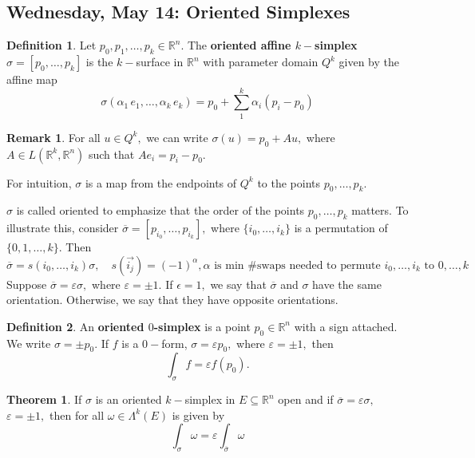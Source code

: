 \documentclass[10pt, oneside]{article}
\newcommand{\bbR}{\mathbb{R}}
\theoremstyle{definition}
\newtheorem{thm}{Theorem}
\newtheorem{defn}{Definition}
\newtheorem{rem}{Remark}
\begin{document}
\newpage
\subsection{Wednesday, May 14: Oriented Simplexes}
\begin{defn}
    Let $p_0, p_1, \dots, p_k \in \bbR^n.$ The \textbf{oriented affine $k-$simplex} $\sigma = [p_0, \dots, p_k]$ is the $k-$surface in $\bbR^n$ with parameter domain $Q^k$ given by the affine map 
    \[\sigma(\alpha_1\,e_1, \dots, \alpha_k \,e_k) = p_0 + \sum_{1}^k \alpha_i(p_i - p_0)\]
\end{defn}
\begin{rem}
   For all $u \in Q^k,$ we can write $\sigma(u) = p_0 + Au,$  where $A \in L(\bbR^k, \bbR^n)$ such that $Ae_i = p_i - p_0.$ 

   For intuition, $\sigma$ is a map from the endpoints of $Q^k$ to the points $p_0, \dots, p_k.$ 

   $\sigma$ is called oriented to emphasize that the order of the points $p_0, \dots, p_k$ matters. To illustrate this, consider $\overline{\sigma} = [p_{i_0}, \dots, p_{i_k}],$ where $\{i_0, \dots, i_k\}$ is a permutation of $\{0,1,\dots, k\}.$ Then 
   \[\overline{\sigma} = s(i_0, \dots, i_k)\sigma, \quad s(\vec{i_j}) = (-1)^\alpha, \alpha\text{ is min \# swaps needed to permute $i_0, \dots, i_k$ to $0, \dots, k$}\] Suppose $\overline{\sigma} = \varepsilon\sigma,$ where $\varepsilon = \pm 1.$ If $\epsilon = 1,$ we say that $\overline{\sigma}$ and $\sigma$ have the same orientation. Otherwise, we say that they have opposite orientations.
\end{rem}

\begin{defn}
    An \textbf{oriented $0$-simplex} is a point $p_0 \in \bbR^n$ with a sign attached. We write $\sigma = \pm p_0.$ If $f$ is a $0-$form, $\sigma = \varepsilon p_0,$ where $\varepsilon = \pm1 ,$ then 
    \[\int_\sigma f = \varepsilon f(p_0).\]
\end{defn}
\begin{thm}
    If $\sigma$ is an oriented $k-$simplex in $E\subseteq \bbR^n$ open and if $\overline{\sigma} = \varepsilon \sigma,$ $\varepsilon = \pm 1,$ then for all $\omega \in \Lambda^k(E)$ is given by 
    \[\int_\sigma \omega = \varepsilon \int_{\overline{\sigma}}\omega\]
\end{thm}
\end{document}
